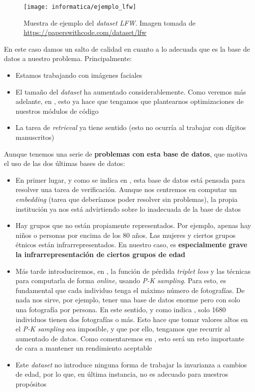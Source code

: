 \begin{figure}[H]
    \centering
    \texttt{[image: informatica/ejemplo\_lfw]}
    \caption{Muestra de ejemplo del \textit{dataset} \textit{LFW}. Imagen tomada de \url{https://paperswithcode.com/dataset/lfw}}
\end{figure}

En este caso damos un salto de calidad en cuanto a lo adecuada que es la base de datos a nuestro problema. Principalmente:

\begin{itemize}
    \item Estamos trabajando con imágenes faciales
    \item El tamaño del \textit{dataset} ha aumentado considerablemente. Como veremos más adelante, en , esto ya hace que tengamos que plantearnos optimizaciones de nuestros módulos de código
    \item La tarea de \textit{retrieval} ya tiene sentido (esto no ocurría al trabajar con dígitos manuscritos)
\end{itemize}

Aunque tenemos una serie de \textbf{problemas con esta base de datos}, que motiva el uso de las dos últimas bases de datos:

\begin{itemize}
    \item En primer lugar, y como se indica en \cite{informatica:lfw_dataset}, esta base de datos está pensada para resolver una tarea de verificación. Aunque nos centremos en computar un \textit{embedding} (tarea que deberíamos poder resolver sin problemas), la propia institución ya nos está advirtiendo sobre lo inadecuada de la base de datos
    \item Hay grupos que no están propiamente representados. Por ejemplo, apenas hay niños o personas por encima de los 80 años. Las mujeres y ciertos grupos étnicos están infrarrepresentados. En nuestro caso, es \textbf{especialmente grave la infrarrepresentación de ciertos grupos de edad}
    \item Más tarde introduciremos, en , la función de pérdida \textit{triplet loss} y las técnicas para computarla de forma \textit{online}, usando \textit{P-K sampling}. Para esto, es fundamental que cada individuo tenga el máximo número de fotografías. De nada nos sirve, por ejemplo, tener una base de datos enorme pero con solo una fotografía por persona. En este sentido, y como indica \cite{informatica:lfw_dataset}, solo 1680 individuos tienen dos fotografías o más. Esto hace que tomar valores altos en el \textit{P-K sampling} sea imposible, y que por ello, tengamos que recurrir al aumentado de datos. Como comentaremos en , esto será un reto importante de cara a mantener un rendimiento aceptable
    \item Este \textit{dataset} no introduce ninguna forma de trabajar la invarianza a cambios de edad, por lo que, en última instancia, no es adecuado para nuestros propósitos
\end{itemize}

